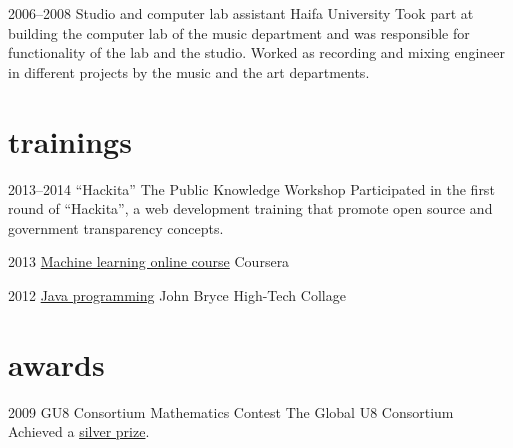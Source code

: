 \documentclass[]{friggeri-cv}  %
\begin{document}
\begin{entrylist}

    \entry
    {2006--2008}
    {Studio and computer lab assistant}
    {Haifa University}
    {Took part at building the computer lab of the music department and was responsible for functionality of the lab and the studio. Worked as recording and mixing engineer in different projects by the music and the art departments.}

\end{entrylist}


\section{trainings}

\begin{entrylist}

    \entry
    {2013--2014}
    {``Hackita''}
    {The Public Knowledge Workshop}
    {Participated in the first round of ``Hackita'', a web development training that promote open source and government transparency concepts.}

\end{entrylist}
\begin{entrylist}

    \entry
    {2013}
    {\href{http://db.tt/hcPmtUpn}{Machine learning online course}}
    {Coursera}

\end{entrylist}
\begin{entrylist}

    \entry
    {2012}
    {\href{http://db.tt/g3VdmoOu}{Java programming}}
    {John Bryce High-Tech Collage}
    
\end{entrylist}


\section{awards}

\begin{entrylist}

    \entry
    {2009}
    {GU8 Consortium Mathematics Contest}
    {The Global U8 Consortium}
    {Achieved a \href{http://db.tt/7b5BuXmT}{silver prize}.}

\end{entrylist}
\end{document}
